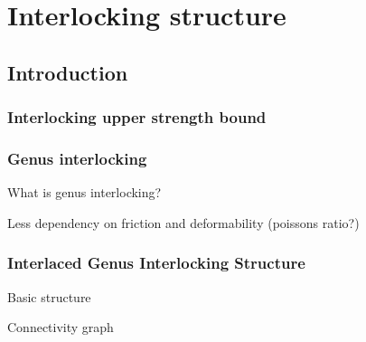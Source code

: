 \section{Interlocking structure}
\subsection{Introduction}

\subsubsection{Interlocking upper strength bound}

\subsubsection{Genus interlocking}
What is genus interlocking?

Less dependency on friction and deformability (poissons ratio?)


\subsubsection{Interlaced Genus Interlocking Structure}
Basic structure

Connectivity graph

